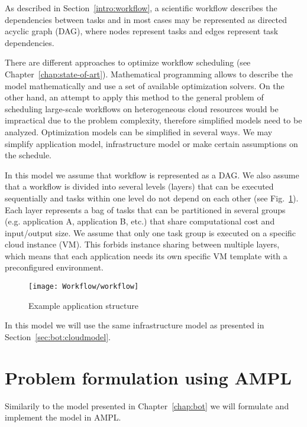 {    As described in Section \ref{intro:workflow}, a scientific workflow describes the dependencies between tasks and in most cases may be represented as directed acyclic graph (DAG), where nodes represent tasks and edges represent task dependencies. 
    
    There are different approaches to optimize workflow scheduling (see Chapter \ref{chap:state-of-art}). Mathematical programming allows to describe the model mathematically and use a set of available optimization solvers. On the other hand, an attempt to apply this method to the general problem of scheduling large-scale workflows on heterogeneous cloud resources would be impractical due to the problem complexity, therefore simplified models need to be analyzed. Optimization models can be simplified in several ways. We may simplify application model, infrastructure model or make certain assumptions on the schedule.
    
    In this model we assume that workflow is represented as a DAG. We also assume that a workflow is divided into several levels (layers) that can be executed sequentially and tasks within one level do not depend on each other (see Fig.~\ref{fig:workflow:appmodel}). Each layer represents a bag of tasks that can be partitioned in several groups (e.g. application A, application B, etc.) that share computational cost and input/output size. We assume that only one task group is executed on a specific cloud instance (VM). This forbids instance sharing between multiple layers, which means that each application needs its own specific VM template with a preconfigured environment.

    \begin{figure}[tb]
        \centering \texttt{[image: Workflow/workflow]}
        \caption{Example application structure}
        \label{fig:workflow:appmodel}
    \end{figure}
    
    In this model we will use the same infrastructure model as presented in Section~\ref{sec:bot:cloudmodel}.
  
    \section{Problem formulation using AMPL}
    \label{sec:workflow:problem}
  
    Similarily to the model presented in Chapter~\ref{chap:bot} we will formulate and implement the model in AMPL.
    
}
